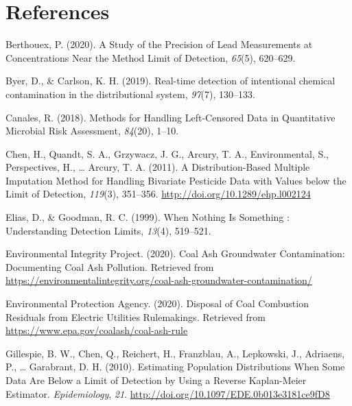 \documentclass[12pt, twoside]{amherstthesis}
\newlength{\cslhangindent}
\newenvironment{cslreferences}%
  {\setlength{\parindent}{0pt}%
  \everypar{\setlength{\hangindent}{\cslhangindent}}\ignorespaces}%
  {\par}
\begin{document}
\backmatter

\hypertarget{references}{%
\chapter*{References}\label{references}}

\noindent

\setlength{\parindent}{-0.20in}
\setlength{\leftskip}{0.20in}
\setlength{\parskip}{8pt}

\hypertarget{refs}{}
\begin{cslreferences}
\leavevmode\hypertarget{ref-Berthouex2020}{}%
Berthouex, P. (2020). A Study of the Precision of Lead Measurements at Concentrations Near the Method Limit of Detection, \emph{65}(5), 620--629.

\leavevmode\hypertarget{ref-Byer2019}{}%
Byer, D., \& Carlson, K. H. (2019). Real-time detection of intentional chemical contamination in the distributional system, \emph{97}(7), 130--133.

\leavevmode\hypertarget{ref-Canales2018}{}%
Canales, R. (2018). Methods for Handling Left-Censored Data in Quantitative Microbial Risk Assessment, \emph{84}(20), 1--10.

\leavevmode\hypertarget{ref-Chen2011}{}%
Chen, H., Quandt, S. A., Grzywacz, J. G., Arcury, T. A., Environmental, S., Perspectives, H., \ldots{} Arcury, T. A. (2011). A Distribution-Based Multiple Imputation Method for Handling Bivariate Pesticide Data with Values below the Limit of Detection, \emph{119}(3), 351--356. \url{http://doi.org/10.1289/ehp.l002124}

\leavevmode\hypertarget{ref-Elias1999}{}%
Elias, D., \& Goodman, R. C. (1999). When Nothing Is Something : Understanding Detection Limits, \emph{13}(4), 519--521.

\leavevmode\hypertarget{ref-EIP2020}{}%
Environmental Integrity Project. (2020). Coal Ash Groundwater Contamination: Documenting Coal Ash Pollution. Retrieved from \url{https://environmentalintegrity.org/coal-ash-groundwater-contamination/}

\leavevmode\hypertarget{ref-Car2020}{}%
Environmental Protection Agency. (2020). Disposal of Coal Combustion Residuals from Electric Utilities Rulemakings. Retrieved from \url{https://www.epa.gov/coalash/coal-ash-rule}

\leavevmode\hypertarget{ref-Gillespie2010}{}%
Gillespie, B. W., Chen, Q., Reichert, H., Franzblau, A., Lepkowski, J., Adriaens, P., \ldots{} Garabrant, D. H. (2010). Estimating Population Distributions When Some Data Are Below a Limit of Detection by Using a Reverse Kaplan-Meier Estimator. \emph{Epidemiology}, \emph{21}. \url{http://doi.org/10.1097/EDE.0b013e3181ce9fD8}


\end{cslreferences}
\end{document}
